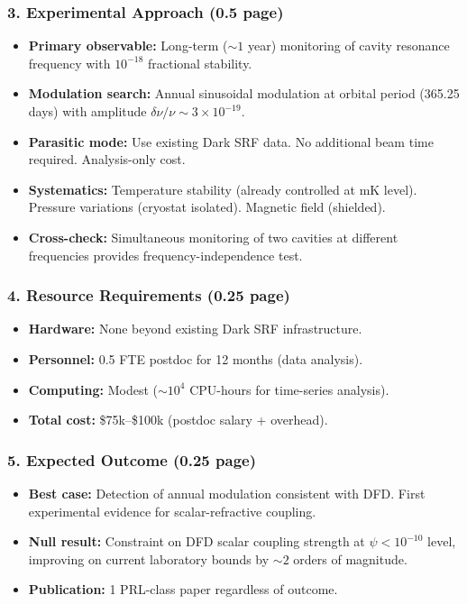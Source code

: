 \documentclass[11pt,a4paper]{article}
\begin{document}
\subsubsection{3. Experimental Approach (0.5 page)}

\begin{itemize}
\item \textbf{Primary observable:} Long-term ($\sim 1$ year) monitoring of cavity resonance frequency with $10^{-18}$ fractional stability.
\item \textbf{Modulation search:} Annual sinusoidal modulation at orbital period (365.25 days) with amplitude $\delta\nu / \nu \sim 3 \times 10^{-19}$.
\item \textbf{Parasitic mode:} Use existing Dark SRF data. No additional beam time required. Analysis-only cost.
\item \textbf{Systematics:} Temperature stability (already controlled at mK level). Pressure variations (cryostat isolated). Magnetic field (shielded).
\item \textbf{Cross-check:} Simultaneous monitoring of two cavities at different frequencies provides frequency-independence test.
\end{itemize}

\subsubsection{4. Resource Requirements (0.25 page)}

\begin{itemize}
\item \textbf{Hardware:} None beyond existing Dark SRF infrastructure.
\item \textbf{Personnel:} 0.5 FTE postdoc for 12 months (data analysis).
\item \textbf{Computing:} Modest ($\sim 10^4$ CPU-hours for time-series analysis).
\item \textbf{Total cost:} \$75k--\$100k (postdoc salary + overhead).
\end{itemize}

\subsubsection{5. Expected Outcome (0.25 page)}

\begin{itemize}
\item \textbf{Best case:} Detection of annual modulation consistent with DFD. First experimental evidence for scalar-refractive coupling.
\item \textbf{Null result:} Constraint on DFD scalar coupling strength at $\psi < 10^{-10}$ level, improving on current laboratory bounds by $\sim 2$ orders of magnitude.
\item \textbf{Publication:} 1 PRL-class paper regardless of outcome.
\end{itemize}
\end{document}
